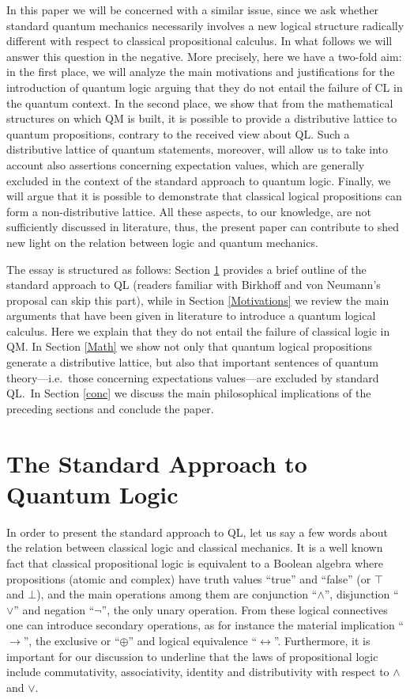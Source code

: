 \documentclass[11pt, executivepaper]{article}
\begin{document}
In this paper we will be concerned with a similar issue, since we ask whether standard quantum mechanics necessarily involves a new logical structure radically different with respect to classical propositional calculus. In what follows we will answer this question in the negative. More precisely, here we have a two-fold aim: in the first place, we will analyze the main motivations and justifications for the introduction of quantum logic arguing that they do not entail the failure of CL in the quantum context. In the second place, we show that from the mathematical structures on which QM is built, it is possible to provide a distributive lattice to quantum propositions, contrary to the received view about QL. Such a distributive lattice of quantum statements, moreover, will allow us to take into account also assertions concerning expectation values, which are generally excluded in the context of the standard approach to quantum logic. Finally, we will argue that it is possible to demonstrate that classical logical propositions can form a non-distributive lattice. All these aspects, to our knowledge, are not sufficiently discussed in literature, thus, the present paper can contribute to shed new light on the relation between logic and quantum mechanics.
\vspace{2mm}

The essay is structured as follows: Section \ref{QL} provides a brief outline of the standard approach to QL (readers familiar with Birkhoff and von Neumann's proposal can skip this part), while in Section \ref{Motivations} we review the main arguments that have been given in literature to introduce a quantum logical calculus. Here we explain  that they do not entail the failure of classical logic in QM. In Section \ref{Math} we show not only that quantum logical propositions generate a distributive lattice, but also that important sentences of quantum theory---i.e.\ those concerning expectations values---are excluded by standard QL.\ In Section \ref{conc} we discuss the main philosophical implications of the preceding sections and conclude the paper.

\section{The Standard Approach to Quantum Logic}
\label{QL}

In order to present the standard approach to QL, let us say a few words about the relation between classical logic and classical mechanics. It is a well known fact that classical propositional logic is equivalent to a Boolean algebra where propositions (atomic and complex) have truth values ``true'' and ``false'' (or $\top$ and $\bot$), and the main operations among them are conjunction ``$\wedge$'', disjunction ``$\vee$'' and negation ``$\neg$'', the only unary operation. From these logical connectives one can introduce secondary operations, as for instance the material implication ``$\longrightarrow$'', the exclusive or ``$\oplus$'' and logical equivalence ``$\longleftrightarrow$''. Furthermore, it is important for our discussion to underline that the laws of propositional logic include commutativity, associativity, identity and distributivity with respect to $\wedge$ and $\vee$.
\end{document}
